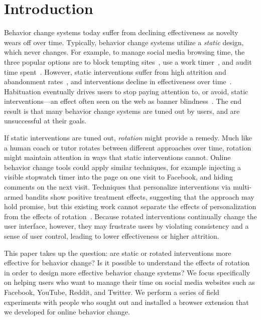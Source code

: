 \section{Introduction}

Behavior change systems today suffer from declining effectiveness as novelty wears off over time. Typically, behavior change systems utilize a \textit{static} design, which never changes. For example, to manage social media browsing time, the three popular options are to block tempting sites~\cite{stayfocusd}, use a work timer~\cite{focusbooster}, and audit time spent~\cite{khovanskaya2013everybody,rescuetimeapp}. However, static interventions suffer from high attrition and abandonment rates~\cite{collins2014social,eysenbach2005law}, and interventions decline in effectiveness over time~\cite{krebs2010meta}. Habituation eventually drives users to stop paying attention to, or avoid, static interventions---an effect often seen on the web as banner blindness~\cite{benway1998banner}. The end result is that many behavior change systems are tuned out by users, and are unsuccessful at their goals.

If static interventions are tuned out, \textit{rotation} might provide a remedy. Much like a human coach or tutor rotates between different approaches over time, rotation might maintain attention in ways that static interventions cannot. Online behavior change tools could apply similar techniques, for example injecting a visible stopwatch timer into the page on one visit to Facebook, and hiding comments on the next visit.
Techniques that personalize interventions via multi-armed bandits show positive treatment effects, suggesting that the approach may hold promise, but this existing work cannot separate the effects of personalization from the effects of rotation~\cite{rabbi2015automated, lei2017actor, paredes2014poptherapy}. %
Because rotated interventions continually change the user interface, however, they may frustrate users by violating consistency and a sense of user control, leading to lower effectiveness or higher attrition. %

This paper takes up the question: are static or rotated interventions more effective for behavior change? Is it possible to understand the effects of rotation in order to design more effective behavior change systems? We focus specifically on helping users who want to manage their time on social media websites such as Facebook, YouTube, Reddit, and Twitter. We perform a series of field experiments with people who sought out and installed a browser extension that we developed for online behavior change. %

